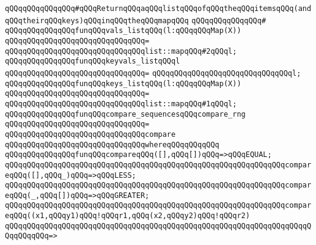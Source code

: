 \newline
\newline
\verb|qQQqqQQqqQQqqQQq#qQQqReturnqQQqaqQQqlistqQQqofqQQqtheqQQqitemsqQQq(andqQQqtheirqQQqkeys)qQQqinqQQqtheqQQqmapqQQq|\newline
\verb|qQQqqQQqqQQqqQQq#|\newline
\verb|qQQqqQQqqQQqqQQqfunqQQqvals_listqQQq(l:qQQqqQQqMap(X))|\newline
\verb|qQQqqQQqqQQqqQQqqQQqqQQqqQQqqQQq=|\newline
\verb|qQQqqQQqqQQqqQQqqQQqqQQqqQQqqQQqlist::mapqQQq#2qQQql;|\newline
\newline
\newline
\verb|qQQqqQQqqQQqqQQqfunqQQqkeyvals_listqQQql|\newline
\verb|qQQqqQQqqQQqqQQqqQQqqQQqqQQqqQQq=|\newline
\verb|qQQqqQQqqQQqqQQqqQQqqQQqqQQqqQQql;|\newline
\newline
\newline
\verb|qQQqqQQqqQQqqQQqfunqQQqkeys_listqQQq(l:qQQqqQQqMap(X))|\newline
\verb|qQQqqQQqqQQqqQQqqQQqqQQqqQQqqQQq=|\newline
\verb|qQQqqQQqqQQqqQQqqQQqqQQqqQQqqQQqlist::mapqQQq#1qQQql;|\newline
\newline
\newline
\verb|qQQqqQQqqQQqqQQqfunqQQqcompare_sequencesqQQqcompare_rng|\newline
\verb|qQQqqQQqqQQqqQQqqQQqqQQqqQQqqQQq=|\newline
\verb|qQQqqQQqqQQqqQQqqQQqqQQqqQQqqQQqcompare|\newline
\verb|qQQqqQQqqQQqqQQqqQQqqQQqqQQqqQQqwhereqQQqqQQqqQQq|\newline
\verb|qQQqqQQqqQQqqQQqfunqQQqcompareqQQq([],qQQq[])qQQq=>qQQqEQUAL;|\newline
\verb|qQQqqQQqqQQqqQQqqQQqqQQqqQQqqQQqqQQqqQQqqQQqqQQqqQQqqQQqqQQqqQQqcompareqQQq([],qQQq_)qQQq=>qQQqLESS;|\newline
\verb|qQQqqQQqqQQqqQQqqQQqqQQqqQQqqQQqqQQqqQQqqQQqqQQqqQQqqQQqqQQqqQQqcompareqQQq(_,qQQq[])qQQq=>qQQqGREATER;|\newline
\newline
\verb|qQQqqQQqqQQqqQQqqQQqqQQqqQQqqQQqqQQqqQQqqQQqqQQqqQQqqQQqqQQqqQQqcompareqQQq((x1,qQQqy1)qQQq!qQQqr1,qQQq(x2,qQQqy2)qQQq!qQQqr2)|\newline
\verb|qQQqqQQqqQQqqQQqqQQqqQQqqQQqqQQqqQQqqQQqqQQqqQQqqQQqqQQqqQQqqQQqqQQqqQQqqQQqqQQq=>|\newline

